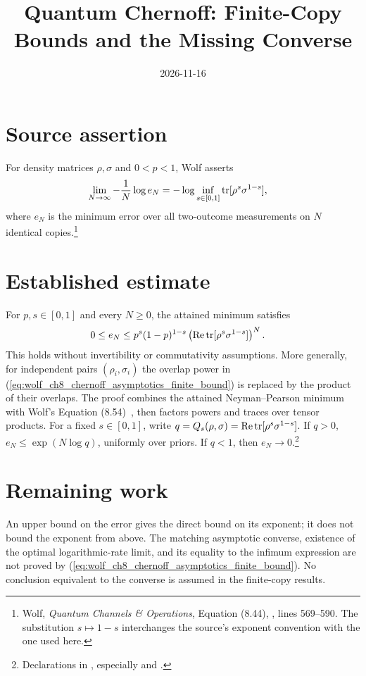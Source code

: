 \documentclass{article}
\title{Quantum Chernoff: Finite-Copy Bounds and the Missing Converse}
\author{}
\date{2026-11-16}
\begin{document}
\maketitle
{}

\section{Source assertion}
For density matrices $\rho,\sigma$ and $0<p<1$, Wolf asserts~\cite[Equation~(8.44)]{Wolf2012Quantum}
\begin{align}
 \lim_{N\to\infty}-\frac1N\log e_N
   &=-\log\inf_{s\in[0,1]}\operatorname{tr}[\rho^s\sigma^{1-s}],
 \label{eq:wolf_ch8_chernoff_asymptotics_source_limit}
\end{align}
where $e_N$ is the minimum error over all two-outcome measurements on $N$
identical copies.\footnote{Wolf, \emph{Quantum Channels \& Operations},
Equation (8.44), ,
lines 569--590. The substitution $s\mapsto1-s$ interchanges the source's
exponent convention with the one used here.}

\section{Established estimate}
For $p,s\in[0,1]$ and every $N\ge0$, the attained minimum satisfies
\begin{align}
 0\le e_N&\le p^s(1-p)^{1-s}
     \left(\operatorname{Re}\operatorname{tr}[\rho^s\sigma^{1-s}]\right)^N.
 \label{eq:wolf_ch8_chernoff_asymptotics_finite_bound}
\end{align}
This holds without invertibility or commutativity assumptions. More generally,
for independent pairs $(\rho_i,\sigma_i)$ the overlap power in
(\ref{eq:wolf_ch8_chernoff_asymptotics_finite_bound}) is replaced by the product of their overlaps.
The proof combines the attained Neyman--Pearson minimum with Wolf's
Equation (8.54)~\cite[Equations~(8.41), (8.54)]{Wolf2012Quantum}, then factors powers and traces over tensor products.
For a fixed $s\in[0,1]$, write
$q=Q_s(\rho,\sigma)=\operatorname{Re}\operatorname{tr}[\rho^s\sigma^{1-s}]$.
If $q>0$, $e_N\le\exp(N\log q)$, uniformly over priors.
If $q<1$, then $e_N\to0$.\footnote{Declarations in
, especially
 and
.}

\section{Remaining work}
An upper bound on the error gives the direct bound on its exponent; it does not
bound the exponent from above. The matching asymptotic converse, existence of
the optimal logarithmic-rate limit, and its equality to the infimum expression
are not proved by (\ref{eq:wolf_ch8_chernoff_asymptotics_finite_bound}). No conclusion equivalent to the
converse is assumed in the finite-copy results.
\end{document}
